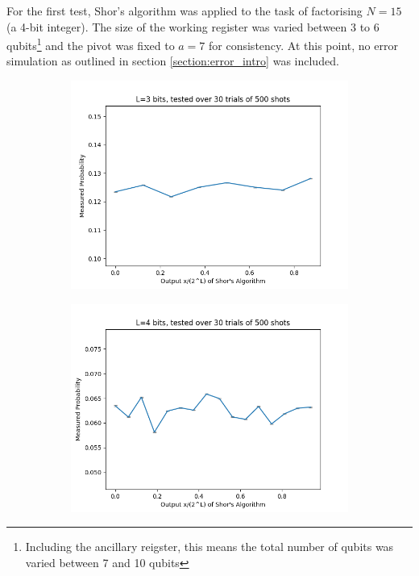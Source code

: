 \documentclass{article}[11pt]
\begin{document}
For the first test, Shor's algorithm was applied to the task of factorising $N=15$ (a 4-bit integer). The size of the working register was varied between 3 to 6 qubits\footnote{Including the ancillary reigster, this means the total number of qubits was varied between 7 and 10 qubits} and the pivot was fixed to $a=7$ for consistency. At this point, no error simulation as outlined in section \ref{section:error_intro} was included.
\begin{figure}[H]
\centering
\begin{subfigure}[t]{0.5\textwidth}
\centering
\includegraphics[width=\linewidth]{Pictures/Shor Factor 15/shor 3 bits factor 15 errorp 0.png}
\end{subfigure}%
\begin{subfigure}[t]{0.5\textwidth}
\centering
\includegraphics[width=\linewidth]{Pictures/Shor Factor 15/shor 4 bits factor 15 errorp 0.png}

\end{subfigure}
\end{figure}
\end{document}
